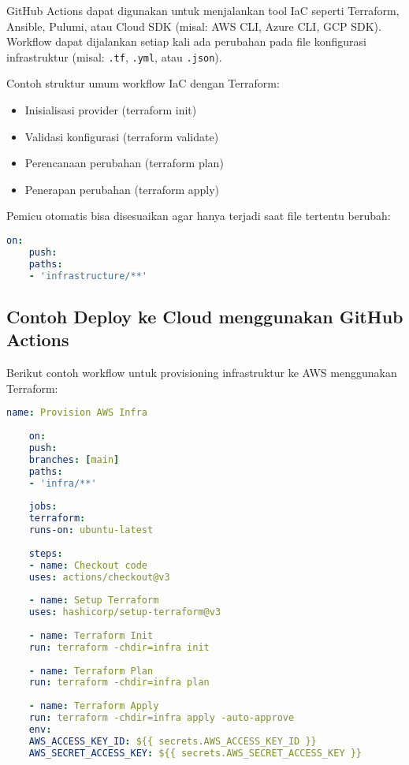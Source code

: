 GitHub Actions dapat digunakan untuk menjalankan tool IaC seperti Terraform, Ansible, Pulumi, atau Cloud SDK (misal: AWS CLI, Azure CLI, GCP SDK). Workflow dapat dijalankan setiap kali ada perubahan pada file konfigurasi infrastruktur (misal: \texttt{.tf}, \texttt{.yml}, atau \texttt{.json}).

Contoh struktur umum workflow IaC dengan Terraform:
\begin{itemize}
	\item Inisialisasi provider (terraform init)
	\item Validasi konfigurasi (terraform validate)
	\item Perencanaan perubahan (terraform plan)
	\item Penerapan perubahan (terraform apply)
\end{itemize}

Pemicu otomatis bisa disesuaikan agar hanya terjadi saat file tertentu berubah:
\begin{lstlisting}[language=yaml, caption={Pemicu Workflow untuk File Infrastruktur}]
	on:
	push:
	paths:
	- 'infrastructure/**'
\end{lstlisting}

\subsection{Contoh Deploy ke Cloud menggunakan GitHub Actions}

Berikut contoh workflow untuk provisioning infrastruktur ke AWS menggunakan Terraform:

\begin{lstlisting}[language=yaml, caption={Contoh Workflow Terraform untuk AWS}]
	name: Provision AWS Infra
	
	on:
	push:
	branches: [main]
	paths:
	- 'infra/**'
	
	jobs:
	terraform:
	runs-on: ubuntu-latest
	
	steps:
	- name: Checkout code
	uses: actions/checkout@v3
	
	- name: Setup Terraform
	uses: hashicorp/setup-terraform@v3
	
	- name: Terraform Init
	run: terraform -chdir=infra init
	
	- name: Terraform Plan
	run: terraform -chdir=infra plan
	
	- name: Terraform Apply
	run: terraform -chdir=infra apply -auto-approve
	env:
	AWS_ACCESS_KEY_ID: ${{ secrets.AWS_ACCESS_KEY_ID }}
	AWS_SECRET_ACCESS_KEY: ${{ secrets.AWS_SECRET_ACCESS_KEY }}
\end{lstlisting}

